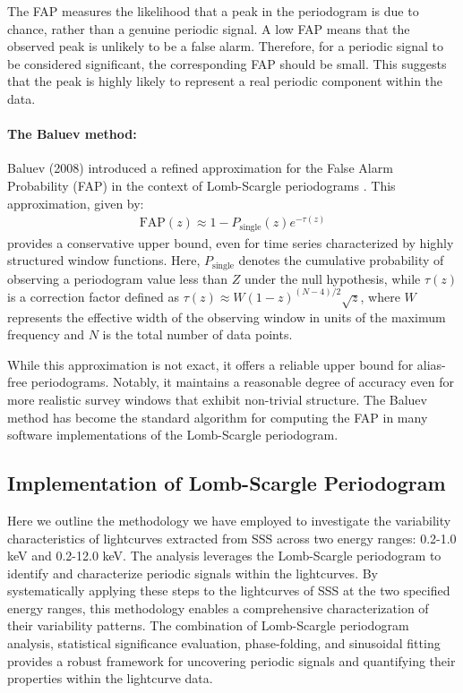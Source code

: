     			The FAP measures the likelihood that a peak in the periodogram is due to chance, rather than a genuine periodic signal. A low FAP means that the observed peak is unlikely to be a false alarm. Therefore, for a periodic signal to be considered significant, the corresponding FAP should be small. This suggests that the peak is highly likely to represent a real periodic component within the data.
    			
    			\paragraph{The Baluev method:}
    			Baluev (2008) introduced a refined approximation for the False Alarm Probability (FAP) in the context of Lomb-Scargle periodograms \cite{baluev2008assessing}. This approximation, given by:
    			\begin{align}
    				\text{FAP}(z)\approx 1 - P_\text{single}(z)e^{-\tau(z)}\label{eqn:L-S-fap-baluev-01}
    			\end{align}
    			provides a conservative upper bound, even for time series characterized by highly structured window functions. Here, $P_\text{single}$ denotes the cumulative probability of observing a periodogram value less than $Z$ under the null hypothesis, while $\tau(z)$ is a correction factor defined as $\tau(z)\approx W(1 - z)^{(N-4)/2}\sqrt{z}$, where $W$ represents the effective width of the observing window in units of the maximum frequency and $N$ is the total number of data points.
    			
    			While this approximation is not exact, it offers a reliable upper bound for alias-free periodograms. Notably, it maintains a reasonable degree of accuracy even for more realistic survey windows that exhibit non-trivial structure. The Baluev method has become the standard algorithm for computing the FAP in many software implementations of the Lomb-Scargle periodogram.
    		
    	\subsection{Implementation of Lomb-Scargle Periodogram}
    		Here we outline the methodology we have employed to investigate the variability characteristics of lightcurves extracted from SSS across two energy ranges: 0.2-1.0 keV and 0.2-12.0 keV. The analysis leverages the Lomb-Scargle periodogram to identify and characterize periodic signals within the lightcurves. By systematically applying these steps to the lightcurves of SSS at the two specified energy ranges, this methodology enables a comprehensive characterization of their variability patterns. The combination of Lomb-Scargle periodogram analysis, statistical significance evaluation, phase-folding, and sinusoidal fitting provides a robust framework for uncovering periodic signals and quantifying their properties within the lightcurve data.
    		    	

